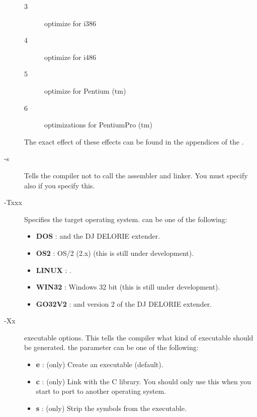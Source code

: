 \documentclass{report}
\newcommand{\olabel}[1]{\label{option:#1}}
\begin{document}
\begin{description}
\begin{description}
\item[3] optimize for i386
\item[4] optimize for i486
\item[5] optimize for Pentium (tm)
\item[6] optimizations for PentiumPro (tm)
\end{description}
The exact effect of these effects can be found in the appendices of the 
\progref.
\item [-s] \olabel{s} Tells the compiler not to call the assembler and linker.
You must specify also  if you specify this.
\item[-Txxx] \olabel{T}Specifies the target operating system.  can be one of
the following:
\begin{itemize}
\item \textbf{DOS} : \dos and the DJ DELORIE extender.
\item \textbf{OS2} : OS/2 (2.x) (this is still under development).
\item \textbf{LINUX} : \linux.
\item \textbf{WIN32} : Windows 32 bit (this is still under development).
\item \textbf{GO32V2} : \dos and version 2 of the DJ DELORIE extender.
\end{itemize}
\item [-Xx] \olabel{X} executable options. This tells the compiler what
kind of \linux executable should be generated. the parameter 
can be one of the following:
\begin{itemize}
\item \textbf{e} : (\linux only) Create an  executable (default).
\item \textbf{c} : (\linux only) Link with the C library. You should only use this when
you start to port \fpk to another operating system.
\item \textbf{s} : (\dos only) Strip the symbols from the executable.
\end{itemize}
\end{description}

%
%

\end{document}
